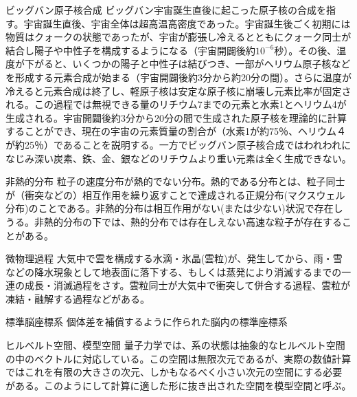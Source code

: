 \begin{用語集}
\item{ビッグバン原子核合成}{}
{ビッグバン宇宙誕生直後に起こった原子核の合成を指す。宇宙誕生直後、宇宙全体は超高温高密度であった。宇宙誕生後ごく初期には物質はクォークの状態であったが、宇宙が膨張し冷えるとともにクォーク同士が結合し陽子や中性子を構成するようになる（宇宙開闢後約$10^{-6}$秒）。その後、温度が下がると、いくつかの陽子と中性子は結びつき、一部がヘリウム原子核などを形成する元素合成が始まる（宇宙開闢後約3分から約20分の間）。さらに温度が冷えると元素合成は終了し、軽原子核は安定な原子核に崩壊し元素比率が固定される。この過程では無視できる量のリチウム7までの元素と水素1とヘリウム4が生成される。宇宙開闢後約3分から20分の間で生成された原子核を理論的に計算することができ、現在の宇宙の元素質量の割合が（水素1が約75％、ヘリウム４が約25％）であることを説明する。一方でビッグバン原子核合成ではわれわれになじみ深い炭素、鉄、金、銀などのリチウムより重い元素は全く生成できない。}
\item{非熱的分布}{}
{粒子の速度分布が熱的でない分布。熱的である分布とは、粒子同士が（衝突などの）相互作用を繰り返すことで達成される正規分布(マクスウェル分布)のことである。非熱的分布は相互作用がない(または少ない)状況で存在しうる。非熱的分布の下では、熱的分布では存在しえない高速な粒子が存在することがある。}
\item{微物理過程}{}
{大気中で雲を構成する水滴・氷晶(雲粒)が、発生してから、雨・雪などの降水現象として地表面に落下する、もしくは蒸発により消滅するまでの一連の成長・消滅過程をさす。雲粒同士が大気中で衝突して併合する過程、雲粒が凍結・融解する過程などがある。}
\item{標準脳座標系}{}
{個体差を補償するように作られた脳内の標準座標系}
\item{ヒルベルト空間、模型空間}{}
{量子力学では、系の状態は抽象的なヒルベルト空間の中のベクトルに対応している。この空間は無限次元であるが、実際の数値計算ではこれを有限の大きさの次元、しかもなるべく小さい次元の空間にする必要がある。このようにして計算に適した形に抜き出された空間を模型空間と呼ぶ。}

\end{用語集}
